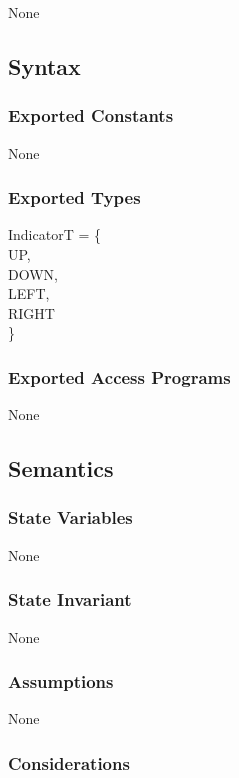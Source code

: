 \documentclass[12pt]{article}
\begin{document}
None

\subsection* {Syntax}

\subsubsection* {Exported Constants}

None

\subsubsection* {Exported Types}

IndicatorT = \{\\
    UP, \\
    DOWN, \\
    LEFT, \\
    RIGHT \\
\}

\subsubsection* {Exported Access Programs}

None

\subsection* {Semantics}

\subsubsection* {State Variables}

None

\subsubsection* {State Invariant}

None

\subsubsection* {Assumptions}

None

\subsubsection* {Considerations}
\end{document}

